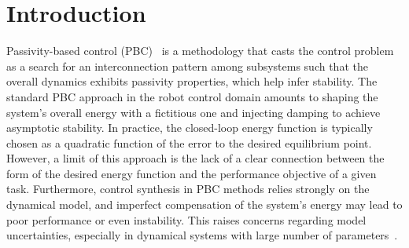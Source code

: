 \section{Introduction}

%
Passivity-based control (PBC)~\cite{ortega2001putting,van2000l2} is a
methodology that casts the control problem as a search for an interconnection
pattern among subsystems such that the overall dynamics exhibits passivity
properties, which help infer stability.
%
The standard PBC approach in the robot control domain amounts to shaping the
system's overall energy with a fictitious one and injecting damping to
achieve asymptotic stability.
%
In practice, the closed-loop energy function is typically chosen as a quadratic
function of the error to the desired equilibrium point.
%
However, a limit of this approach is the lack of a clear connection between the
form of the desired energy function and the performance objective of a given
task.
%
Furthermore, control synthesis in PBC methods relies strongly on the dynamical
model, and imperfect compensation of the system's energy may lead to poor
performance or even instability.
%
This raises concerns regarding model uncertainties, especially in dynamical
systems with large number of parameters~\cite{nagy,wu2020active}.
%
%


